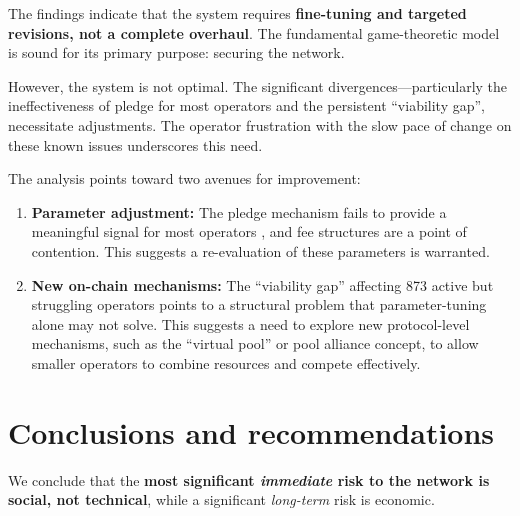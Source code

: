 \documentclass[11pt, letterpaper]{article}
\begin{document}
The findings indicate that the system requires \textbf{fine-tuning and targeted revisions,
not a complete overhaul}. The fundamental game-theoretic model is sound for its primary purpose:
securing the network.

However, the system is not optimal. The significant divergences—particularly the ineffectiveness
of pledge for most operators and the persistent ``viability gap'', necessitate adjustments. The operator
frustration with the slow pace of change on these known issues underscores this need.

The analysis points toward two avenues for improvement:
\begin{enumerate}
	\item \textbf{Parameter adjustment:} The pledge mechanism fails to provide a meaningful signal
	      for most operators , and fee structures are a point of contention. This suggests a re-evaluation
	      of these parameters is warranted.
	\item \textbf{New on-chain mechanisms:} The ``viability gap'' affecting 873 active but struggling
	      operators points to a structural problem that parameter-tuning alone may not solve. This suggests
	      a need to explore new protocol-level mechanisms, such as the ``virtual pool'' or pool alliance concept,
	      to allow smaller operators to combine resources and compete effectively.
\end{enumerate}

\section{Conclusions and recommendations}

We conclude that the \textbf{most significant \textit{immediate} risk to the network is social,
	not technical}, while a significant \textit{long-term} risk is economic.
\end{document}
